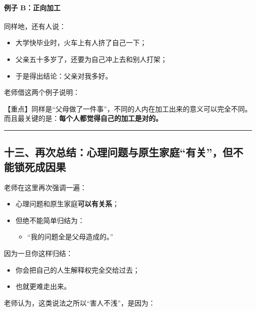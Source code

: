 \documentclass[
  chinese,
  9pt,
  a4paper,
]{ctexart}
\providecommand{\tightlist}{%
  \setlength{\itemsep}{0pt}\setlength{\parskip}{0pt}}
\begin{document}
\paragraph{例子
B：正向加工}\label{ux4f8bux5b50-bux6b63ux5411ux52a0ux5de5}

同样地，还有人说：

\begin{itemize}
\tightlist
\item
  大学快毕业时，火车上有人挤了自己一下；
\item
  父亲五十多岁了，还要为自己冲上去和别人打架；
\item
  于是得出结论：父亲对我多好。
\end{itemize}

老师借这两个例子说明：

【重点】同样是``父母做了一件事''，不同的人内在加工出来的意义可以完全不同。
而且最关键的是：\textbf{每个人都觉得自己的加工是对的。}

\begin{center}\rule{0.5\linewidth}{0.5pt}\end{center}

\subsection{十三、再次总结：心理问题与原生家庭``有关''，但不能锁死成因果}\label{ux5341ux4e09ux518dux6b21ux603bux7ed3ux5fc3ux7406ux95eeux9898ux4e0eux539fux751fux5bb6ux5eadux6709ux5173ux4f46ux4e0dux80fdux9501ux6b7bux6210ux56e0ux679c}

老师在这里再次强调一遍：

\begin{itemize}
\item
  心理问题和原生家庭\textbf{可以有关系}；
\item
  但绝不能简单归结为：

  \begin{itemize}
  \tightlist
  \item
    ``我的问题全是父母造成的。''
  \end{itemize}
\end{itemize}

因为一旦你这样归结：

\begin{itemize}
\tightlist
\item
  你会把自己的人生解释权完全交给过去；
\item
  也就更难走出来。
\end{itemize}

老师认为，这类说法之所以``害人不浅''，是因为：
\end{document}
